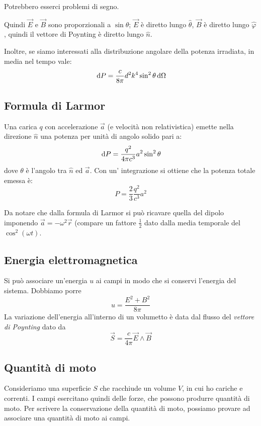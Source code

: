\documentclass[a4paper,10pt,oneside]{math_article}
\renewcommand{\phi}{\varphi }
\begin{document}
			Potrebbero esserci problemi di segno.

			Quindi $\vec E$ e $\vec B$ sono proporzionali a $\sin \theta$; $\vec E$ è diretto lungo $\hat \theta$, $\vec B$ è diretto lungo $\hat \phi$, quindi il vettore di Poynting è diretto lungo $\hat n$.
			
			Inoltre, se siamo interessati alla distribuzione angolare della potenza irradiata, in media nel tempo vale:
			\[
			 \, \textrm{d} P = \frac c{8\pi} d^2k^4\sin^2\theta  \, \textrm{d}\Omega
			\]
		\subsection{Formula di Larmor} 
			Una carica $q$ con accelerazione $\vec a$ (e velocità non relativistica) emette nella direzione $\hat n$ una potenza per unità di angolo solido pari a:
			\[
				\, \textrm{d} P=\frac{q^2}{4\pi c^3}a^2\sin^2 \theta
			\]
			dove $\theta$ è l'angolo tra $\hat n$ ed $\vec a$. Con un' integrazione si ottiene che la potenza totale emessa è:
			\[
				P=\frac{2}{3}\frac{q^2}{c^3} a^2
			\]
			
			Da notare che dalla formula di Larmor si può ricavare quella del dipolo imponendo $\vec a = - \omega^2 \vec r$ (compare un fattore $\frac12$ dato dalla media temporale del $\cos^2(\omega t)$.
		\subsection{Energia elettromagnetica}
			Si può associare un'energia $u$ ai campi in modo che si conservi l'energia del sistema. Dobbiamo porre
			\begin{equation}
				u = \frac {E^2+B^2}{8\pi}
			\end{equation}
			La variazione dell'energia all'interno di un volumetto è data dal flusso del \emph{vettore di Poynting} dato da 
			\begin{equation}
				\vec S=\frac{c}{4\pi} \vec E \wedge \vec B
			\end{equation}


			
		\subsection{Quantità di moto}
			Consideriamo una superficie $S$ che racchiude un volume $V$, in cui ho cariche e correnti. I campi esercitano quindi delle forze, che possono produrre quantità di moto. Per scrivere la conservazione della quantità di moto, possiamo provare ad associare una quantità di moto ai campi.
			
\end{document}
